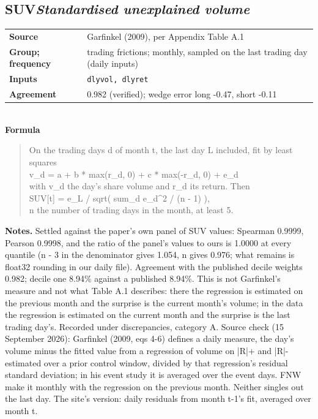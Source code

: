\documentclass[11pt]{article}
\begin{document}
\subsection*{SUV\quad\normalfont\itshape Standardised unexplained volume}
\begin{tabular}{@{}p{3.3cm}p{12.3cm}@{}}
\textbf{Source} & Garfinkel (2009), per Appendix Table A.1\\
\textbf{Group; frequency} & trading frictions; monthly, sampled on the last trading day (daily inputs)\\
\textbf{Inputs} & \texttt{dlyvol, dlyret}\\
\textbf{Agreement} & 0.982 (verified); wedge error long -0.47, short -0.11\\
\end{tabular}\\[4pt]
\textbf{Formula}
\begin{quote}\small
On the trading days d of month t, the last day L included, fit by least squares\\
    v\_d = a + b * max(r\_d, 0) + c * max(-r\_d, 0) + e\_d\\
with v\_d the day's share volume and r\_d its return. Then\\
    SUV[t] = e\_L / sqrt( sum\_d e\_d\textasciicircum{}2 / (n - 1) ),\\
n the number of trading days in the month, at least 5.\\

\end{quote}
\textbf{Notes.} Settled against the paper's own panel of SUV values: Spearman 0.9999, Pearson 0.9998, and the ratio of the panel's values to ours is 1.0000 at every quantile (n - 3 in the denominator gives 1.054, n gives 0.976; what remains is float32 rounding in our daily file). Agreement with the published decile weights 0.982; decile one 8.94\% against a published 8.94\%. This is not Garfinkel's measure and not what Table A.1 describes: there the regression is estimated on the previous month and the surprise is the current month's volume; in the data the regression is estimated on the current month and the surprise is the last trading day's. Recorded under discrepancies, category A. Source check (15 September 2026): Garfinkel (2009, eqs 4-6) defines a daily measure, the day's volume minus the fitted value from a regression of volume on |R|+ and |R|- estimated over a prior control window, divided by that regression's residual standard deviation; in his event study it is averaged over the event days. FNW make it monthly with the regression on the previous month. Neither singles out the last day. The site's version: daily residuals from month t-1's fit, averaged over month t.
\end{document}
